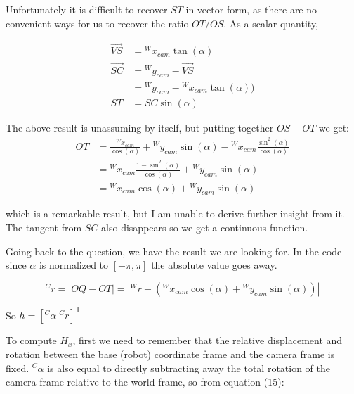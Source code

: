 \documentclass{article}
\begin{document}
\begin{enumerate}[label=(\roman*)]
Unfortunately it is difficult to recover $ST$ in vector form, as there are no convenient ways for us to recover the ratio $OT/OS$. As a scalar quantity,

\begin{equation}
\begin{aligned}
\overrightarrow{VS}
&= {}^W x_{cam} \tan(\alpha) \\
\overrightarrow{SC}
&= {}^W y_{cam} - \overrightarrow{VS} \\
&= {}^W y_{cam} - {}^W x_{cam} \tan(\alpha)) \\
ST &= SC \sin(\alpha)
\end{aligned}
\end{equation}

The above result is unassuming by itself, but putting together $OS + OT$ we get:
\begin{equation}
\begin{aligned}
OT &= \frac{{}^W x_{cam}}{\cos(\alpha)} + {}^W y_{cam}\sin(\alpha) - {}^W x_{cam} \frac{\sin^2(\alpha)}{\cos(\alpha)} \\
&= {}^W x_{cam} \frac{1-\sin^2(\alpha)}{\cos(\alpha)} + {}^W y_{cam} \sin(\alpha) \\
&= {}^W x_{cam} \cos(\alpha) + {}^W y_{cam} \sin(\alpha)
\end{aligned}
\end{equation}

which is a remarkable result, but I am unable to derive further insight from it. The tangent from $SC$ also disappears so we get a continuous function.

Going back to the question, we have the result we are looking for. In the code since $\alpha$ is normalized to $[-\pi, \pi]$ the absolute value goes away.

\begin{equation}
{}^C r = |OQ - OT| = | {}^W r - ({}^W x_{cam} \cos(\alpha) + {}^W y_{cam} \sin(\alpha)) |
\end{equation}

So $h = [{}^C\alpha \; {}^C r]^\mathsf{T}$

To compute $H_x$, first we need to remember that the relative displacement and rotation between the base (robot) coordinate frame and the camera frame is fixed. ${}^C\alpha$ is also equal to directly subtracting away the total rotation of the camera frame relative to the world frame, so from equation (15):


\end{enumerate}
\end{document}
